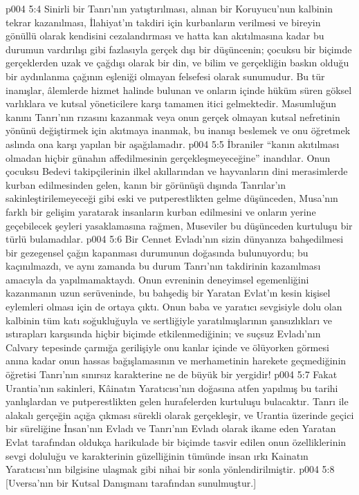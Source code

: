 \vs p004 5:4 Sinirli bir Tanrı’nın yatıştırılması, alınan bir Koruyucu’nun kalbinin tekrar kazanılması, İlahiyat’ın takdiri için kurbanların verilmesi ve bireyin gönüllü olarak kendisini cezalandırması ve hatta kan akıtılmasına kadar bu durumun vardırılışı gibi fazlasıyla gerçek dışı bir düşüncenin; çocuksu bir biçimde gerçeklerden uzak ve çağdışı olarak bir din, ve bilim ve gerçekliğin baskın olduğu bir aydınlanma çağının eşleniği olmayan felsefesi olarak sunumudur. Bu tür inanışlar, âlemlerde hizmet halinde bulunan ve onların içinde hüküm süren göksel varlıklara ve kutsal yöneticilere karşı tamamen itici gelmektedir. Masumluğun kanını Tanrı’nın rızasını kazanmak veya onun gerçek olmayan kutsal nefretinin yönünü değiştirmek için akıtmaya inanmak, bu inanışı beslemek ve onu öğretmek aslında ona karşı yapılan bir aşağılamadır.
\vs p004 5:5 İbraniler “kanın akıtılması olmadan hiçbir günahın affedilmesinin gerçekleşmeyeceğine” inandılar. Onun çocuksu Bedevi takipçilerinin ilkel akıllarından ve hayvanların dini merasimlerde kurban edilmesinden gelen, kanın bir görünüşü dışında Tanrılar’ın sakinleştirilemeyeceği gibi eski ve putperestlikten gelme düşünceden, Musa’nın farklı bir gelişim yaratarak insanların kurban edilmesini ve onların yerine geçebilecek şeyleri yasaklamasına rağmen, Museviler bu düşünceden kurtuluşu bir türlü bulamadılar.
\vs p004 5:6 Bir Cennet Evladı’nın sizin dünyanıza bahşedilmesi bir gezegensel çağın kapanması durumunun doğasında bulunuyordu; bu kaçınılmazdı, ve aynı zamanda bu durum Tanrı’nın takdirinin kazanılması amacıyla da yapılmamaktaydı. Onun evreninin deneyimsel egemenliğini kazanmanın uzun serüveninde, bu bahşediş bir Yaratan Evlat’ın kesin kişisel eylemleri olması için de ortaya çıktı. Onun baba ve yaratıcı sevgisiyle dolu olan kalbinin tüm katı soğukluğuyla ve sertliğiyle yaratılmışlarının şansızlıkları ve ıstırapları karşısında hiçbir biçimde etkilenmediğinin; ve suçsuz Evladı’nın Calvary tepesinde çarmığa gerilişiyle onu kanlar içinde ve ölüyorken görmesi anına kadar onun hassas bağışlamasının ve merhametinin harekete geçmediğinin öğretisi Tanrı’nın sınırsız karakterine ne de büyük bir yergidir!
\vs p004 5:7 Fakat Urantia’nın sakinleri, Kâinatın Yaratıcısı’nın doğasına atfen yapılmış bu tarihi yanlışlardan ve putperestlikten gelen hurafelerden kurtuluşu bulacaktır. Tanrı ile alakalı gerçeğin açığa çıkması sürekli olarak gerçekleşir, ve Urantia üzerinde geçici bir süreliğine İnsan’nın Evladı ve Tanrı'nın Evladı olarak ikame eden Yaratan Evlat tarafından oldukça harikulade bir biçimde tasvir edilen onun özelliklerinin sevgi doluluğu ve karakterinin güzelliğinin tümünde insan ırkı Kainatın Yaratıcısı’nın bilgisine ulaşmak gibi nihai bir sonla yönlendirilmiştir.
\vs p004 5:8 [Uversa’nın bir Kutsal Danışmanı tarafından sunulmuştur.]
